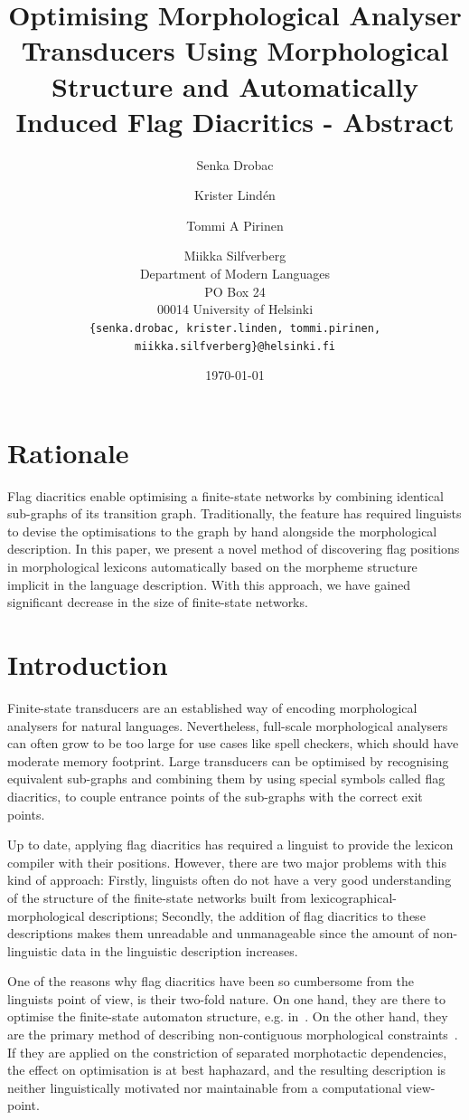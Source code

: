 \documentclass[11pt]{article}
\title{Optimising Morphological Analyser Transducers Using Morphological Structure
and Automatically Induced Flag Diacritics - Abstract}
\author{Senka Drobac \and Krister Lind\'{e}n \and Tommi A Pirinen \and Miikka Silfverberg  \\
Department of Modern Languages \\
PO Box 24 \\
00014 University of Helsinki \\
{\tt \{senka.drobac, krister.linden, tommi.pirinen, miikka.silfverberg\}@helsinki.fi}}
\date{\today}
\begin{document}
\maketitle

\section{Rationale}

    Flag diacritics enable optimising a finite-state networks by
    combining identical sub-graphs of its transition
    graph. Traditionally, the feature has required linguists to devise
    the optimisations to the graph by hand alongside the morphological
    description. In this paper, we present a novel method of
    discovering flag positions in morphological lexicons automatically
    based on the morpheme structure implicit in the language
    description. With this approach, we have gained significant
    decrease in the size of finite-state networks.

\section{Introduction}

Finite-state transducers are an established way of encoding
morphological analysers for natural languages. Nevertheless,
full-scale morphological analysers can often grow to be too large for
use cases like spell checkers, which should have moderate memory
footprint. Large transducers can be optimised by recognising
equivalent sub-graphs and combining them by using special symbols called
flag diacritics, to couple entrance points of the sub-graphs with the
correct exit points.

Up to date, applying flag diacritics has required a linguist to provide
the lexicon compiler with their positions. However, there are two
major problems with this kind of approach: Firstly, linguists often do
not have a very good understanding of the structure of the
finite-state networks built from lexicographical-morphological
descriptions; Secondly, the addition of flag diacritics to these
descriptions makes them unreadable and unmanageable since the amount
of non-linguistic data in the linguistic description increases. 

One of the reasons why flag diacritics have been so cumbersome from
the linguists point of view, is their two-fold nature. On one hand,
they are there to optimise the finite-state automaton structure,
e.g. in~\cite{karttunen2006numbers}. On the other hand, they are the
primary method of describing non-contiguous morphological
constraints~\cite{beesley1998constraining}. If they are applied on the
constriction of separated morphotactic dependencies, the effect on
optimisation is at best haphazard, and the resulting description is
neither linguistically motivated nor maintainable from a computational
view-point.
\end{document}
